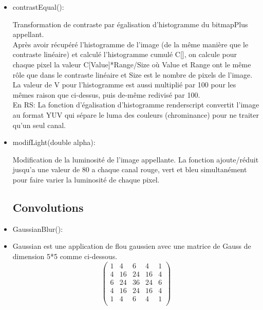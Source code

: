 \documentclass[12pt]{article}
\begin{document}
\begin{itemize}
    \item contrastEqual():
 
    Transformation de contraste par égalisation d'histogramme du bitmapPlus appellant.\\
    Après avoir récupéré l'histogramme de l'image (de la même manière que le contraste linéaire) et calculé l'histogramme cumulé C[],
    on calcule pour chaque pixel la valeur C[Value]*Range/Size où Value et Range ont le même rôle que dans le contraste linéaire 
    et Size est le nombre de pixels de l'image. La valeur de V pour l'histogramme est aussi multiplié par 100 
    pour les mêmes raison que ci-dessus, puis de-même redivisé par 100.\\

    En RS: La fonction d'égalisation d'histogramme renderscript convertit l'image au format YUV qui sépare le luma des couleurs (chrominance) pour ne traiter qu'un seul canal.
    

    \item modifLight(double alpha):
    
    Modification de la luminosité de l'image appellante.
    La fonction ajoute/réduit jusqu'a une valeur de 80 a chaque canal rouge, vert et bleu simultanément pour faire varier la luminosité de chaque pixel.

    \subsection{Convolutions}


    \item GaussianBlur():
    
    \item Gaussian est une application de flou gaussien avec une matrice de Gauss de dimension 5*5 comme ci-dessous.
        \begin{equation}
            \begin{pmatrix}
                1 & 4 & 6 & 4& 1\\
                4 & 16 & 24 & 16 & 4\\
                6 & 24 & 36 & 24 & 6\\
                4 & 16 & 24 & 16 & 4\\
                1 & 4 & 6 & 4 & 1\\
            \end{pmatrix}
        \end{equation} 


\end{itemize}
\end{document}
